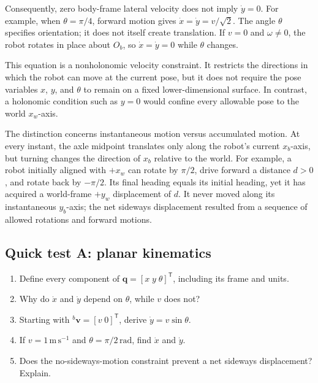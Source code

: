 \documentclass[
  australian,
  12pt,
  letterpaper,
  DIV=11,
  numbers=noendperiod,
  twoside]{scrreprt}
\providecommand{\tightlist}{%
  \setlength{\itemsep}{0pt}\setlength{\parskip}{0pt}}
\begin{document}
Consequently, zero body-frame lateral velocity does not imply
\(\dot y=0\). For example, when \(\theta=\pi/4\), forward motion gives
\(\dot x=\dot y=v/\sqrt{2}\). The angle \(\theta\) specifies
orientation; it does not itself create translation. If \(v=0\) and
\(\omega\ne0\), the robot rotates in place about \(O_b\), so
\(\dot x=\dot y=0\) while \(\theta\) changes.

This equation is a nonholonomic velocity constraint. It restricts the
directions in which the robot can move at the current pose, but it does
not require the pose variables \(x\), \(y\), and \(\theta\) to remain on
a fixed lower-dimensional surface. In contrast, a holonomic condition
such as \(y=0\) would confine every allowable pose to the world
\(x_w\)-axis.

The distinction concerns instantaneous motion versus accumulated motion.
At every instant, the axle midpoint translates only along the robot's
current \(x_b\)-axis, but turning changes the direction of \(x_b\)
relative to the world. For example, a robot initially aligned with
\(+x_w\) can rotate by \(\pi/2\), drive forward a distance \(d>0\), and
rotate back by \(-\pi/2\). Its final heading equals its initial heading,
yet it has acquired a world-frame \(+y_w\) displacement of \(d\). It
never moved along its instantaneous \(y_b\)-axis; the net sideways
displacement resulted from a sequence of allowed rotations and forward
motions.

\subsection*{Quick test A: planar
kinematics}\label{quick-test-a-planar-kinematics}

\begin{enumerate}
\def\labelenumi{\arabic{enumi}.}
\tightlist
\item
  Define every component of \(\mathbf q=[x\;y\;\theta]^\mathsf T\),
  including its frame and units.
\item
  Why do \(\dot x\) and \(\dot y\) depend on \(\theta\), while \(v\)
  does not?
\item
  Starting with \({}^{b}\mathbf v=[v\;0]^\mathsf T\), derive
  \(\dot y=v\sin\theta\).
\item
  If \(v=1\,\mathrm{m\,s^{-1}}\) and \(\theta=\pi/2\,\mathrm{rad}\),
  find \(\dot x\) and \(\dot y\).
\item
  Does the no-sideways-motion constraint prevent a net sideways
  displacement? Explain.
\end{enumerate}
\end{document}
